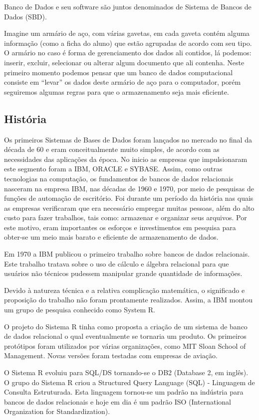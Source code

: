 \documentclass{article}
\begin{document}
Banco de Dados e seu software são juntos denominados de Sistema de Bancos de Dados (SBD).

Imagine um armário de aço, com várias gavetas, em cada gaveta contém alguma informação (como a ficha do aluno) que estão agrupadas de acordo com seu tipo. O armário no caso é forma de gerenciamento dos dados ali contidos, lá podemos: inserir, excluir, selecionar ou alterar algum documento que ali contenha. Neste primeiro momento podemos pensar que um banco de dados computacional consiste em “levar” os dados deste armário de aço para o computador, porém seguiremos algumas regras para que o armazenamento seja mais eficiente.

\subsection{História}
Os primeiros Sistemas de Bases de Dados foram lançados no mercado no final da década de 60 e eram conceitualmente muito simples, de acordo com as necessidades das aplicações da época. No inicio as empresas que impulsionaram este segmento foram a IBM, ORACLE e SYBASE. Assim, como outras tecnologias na computação, os fundamentos de bancos de dados relacionais nasceram na empresa IBM, nas décadas de 1960 e 1970, por meio de pesquisas de funções de automação de escritório. Foi durante um período da história nas quais as empresas verificaram que era necessário empregar muitas pessoas, além do alto custo para fazer trabalhos, tais como: armazenar e organizar seus arquivos. Por este motivo, eram importantes os esforços e investimentos em pesquisa para obter-se um meio mais barato e eficiente de armazenamento de dados.

Em 1970 a IBM publicou o primeiro trabalho sobre bancos de dados relacionais. Este trabalho tratava sobre o uso de cálculo e álgebra relacional para que usuários não técnicos pudessem manipular grande quantidade de informações.

Devido à natureza técnica e a relativa complicação matemática, o significado e proposição do trabalho não foram prontamente realizados. Assim, a IBM montou um grupo de pesquisa conhecido como System R.

O projeto do Sistema R tinha como proposta a criação de um sistema de banco de dados relacional o qual eventualmente se tornaria um produto. Os primeiros protótipos foram utilizados por várias organizações, como MIT Sloan School of Management. Novas versões foram testadas com empresas de aviação.

O Sistema R evoluiu para SQL/DS tornando-se o DB2 (Database 2, em inglês). O grupo do Sistema R criou a Structured Query Language (SQL) - Linguagem de Consulta Estruturada. Esta linguagem tornou-se um padrão na indústria para bancos de dados relacionais e hoje em dia é um padrão ISO (International Organization for Standardization).
\end{document}
